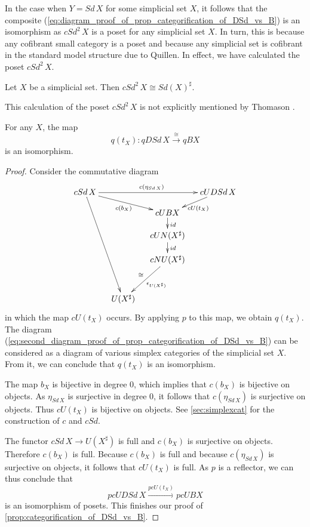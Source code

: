 In the case when $Y=Sd\, X$ for some simplicial set $X$, it follows that the composite (\ref{eq:diagram_proof_of_prop_categorification_of_DSd_vs_B}) is an isomorphism as $cSd^2\, X$ is a poset for any simplicial set $X$. In turn, this is because any cofibrant small category is a poset \cite[Proposition~5.7, p.~323]{Th80} and because any simplicial set is cofibrant in the standard model structure due to Quillen. In effect, we have calculated the poset $cSd^2\, X$.
\begin{lemma}
Let $X$ be a simplicial set. Then $cSd^2\, X\cong Sd(X)^\sharp$.
\end{lemma}
\noindent This calculation of the poset $cSd^2\, X$ is not explicitly mentioned by Thomason \cite{Th80}.
\begin{proposition}\label{prop:categorification_of_DSd_vs_B}
For any $X$, the map
\[q(t_X):qDSd\, X\xrightarrow{\cong } qBX\]
is an isomorphism.
\end{proposition}
\begin{proof}
Consider the commutative diagram
\begin{equation}
\label{eq:second_diagram_proof_of_prop_categorification_of_DSd_vs_B}
\begin{gathered}
\xymatrix@=1.2em{
cSd\, X \ar[dddddr] \ar[drr]_{c(b_X)} \ar[rrr]^{c(\eta _{Sd\, X})} &&& cUDSd\, X \ar[ld]^{cU(t_X)} \\
&& cUBX \ar[d]^{id} \\
&& cUN(X^\sharp ) \ar[d]^{id} \\
&& cNU(X^\sharp ) \ar[ldd]_\cong ^{\epsilon _{U(X^\sharp )}} \\
\\
& U(X^\sharp )
}
\end{gathered}
\end{equation}
in which the map $cU(t_X)$ occurs. By applying $p$ to this map, we obtain $q(t_X)$. The diagram (\ref{eq:second_diagram_proof_of_prop_categorification_of_DSd_vs_B}) can be considered as a diagram of various simplex categories of the simplicial set $X$. From it, we can conclude that $q(t_X)$ is an isomorphism.

The map $b_X$ is bijective in degree $0$, which implies that $c(b_X)$ is bijective on objects. As $\eta _{Sd\, X}$ is surjective in degree $0$, it follows that $c(\eta _{Sd\, X})$ is surjective on objects. Thus $cU(t_X)$ is bijective on objects. See \cref{sec:simplexcat} for the construction of $c$ and $cSd$.

The functor $cSd\, X\to U(X^\sharp )$ is full and $c(b_X)$ is surjective on objects. Therefore $c(b_X)$ is full. Because $c(b_X)$ is full and because $c(\eta _{Sd\, X})$ is surjective on objects, it follows that $cU(t_X)$ is full. As $p$ is a reflector, we can thus conclude that
\[pcUDSd\, X\xrightarrow{pcU(t_X)} pcUBX\]
is an isomorphism of posets. This finishes our proof of \cref{prop:categorification_of_DSd_vs_B}.
\end{proof}
